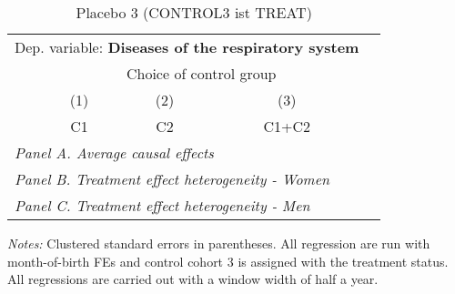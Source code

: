  \begin{table}[H] \centering \begin{threeparttable} \caption{Placebo 3 (CONTROL3 ist TREAT) } {\def\sym#1{\ifmmode^{#1}\else\(^{#1}\)\fi} \begin{tabular}{l*{4}{c}} \toprule \multicolumn{4}{l}{Dep. variable: \textbf{Diseases of the respiratory system}} \\ & \multicolumn{3}{c}{Choice of control group} \\ \cmidrule(lr){2-4}
            &\multicolumn{1}{c}{(1)}&\multicolumn{1}{c}{(2)}&\multicolumn{1}{c}{(3)}\\
            &\multicolumn{1}{c}{C1}&\multicolumn{1}{c}{C2}&\multicolumn{1}{c}{C1+C2}\\
\midrule
 \multicolumn{4}{l}{\emph{Panel A. Average causal effects}} \\      \midrule\multicolumn{4}{l}{\emph{Panel B. Treatment effect heterogeneity - Women}} \\      \midrule\multicolumn{4}{l}{\emph{Panel C. Treatment effect heterogeneity - Men}} \\      
\bottomrule \end{tabular} } \begin{tablenotes} \item \scriptsize \emph{Notes:} Clustered standard errors in parentheses. All regression are run with month-of-birth FEs and control cohort 3 is assigned with the treatment status. All regressions are carried out with a window width of half a year. \end{tablenotes} \end{threeparttable} \end{table} 
